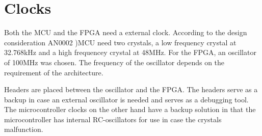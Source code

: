 \documentclass[../main/report.tex]{subfiles}
\begin{document}
\section{Clocks}
Both the MCU and the FPGA need a external clock.
According to the design consideration AN0002 \cite{efm32gg design consideration})MCU need two crystals, a low frequency crystal at 32.768kHz and a high frequencey crystal at 48MHz. 
For the FPGA, an oscillator of 100MHz was chosen. The frequency of the oscillator depends on the requirement of the architecture.

Headers are placed between the oscillator and the FPGA. 
The headers serve as a backup in case an external oscillator is needed and serves as a debugging tool.
The microcontroller clocks on the other hand have a backup solution in that the microcontroller has internal RC-oscillators for use in case the crystals malfunction.
\end{document}
